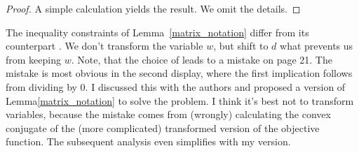 \begin{proof}
  A simple calculation yields the result. We omit the details.
\end{proof}
\begin{remark}
  The inequality constraints of
  Lemma~\ref{matrix_notation} differ from its counterpart
  \cite[Proof of Lemma~1]{Wang2019}.
  We don't transform the variable $w$, but shift to $d$ what prevents us from keeping $w$.
  Note, that the choice of
  \cite[Proof of Lemma~1]{Wang2019} leads to a mistake on page 21.
  The mistake is most obvious in the second display, where the first implication follows from dividing by 0. I discussed this with the authors and proposed a version of Lemma\ref{matrix_notation} to solve the problem. I think it's best not to transform variables, because the mistake comes from (wrongly) calculating the convex conjugate of the (more complicated) transformed version of the objective function. The subsequent analysis even simplifies with my version.
\end{remark}

